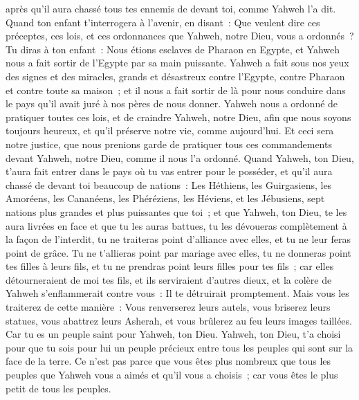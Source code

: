 \begin{multicols}{2}
après qu'il aura chassé tous tes ennemis de devant toi, comme Yahweh l'a dit.
Quand ton enfant t'interrogera à l'avenir, en disant~: Que veulent dire ces préceptes, ces lois, et ces ordonnances que Yahweh, notre Dieu, vous a ordonnés~?
Tu diras à ton enfant~: Nous étions esclaves de Pharaon en Egypte, et Yahweh nous a fait sortir de l'Egypte par sa main puissante.
Yahweh a fait sous nos yeux des signes et des miracles, grands et désastreux contre l'Egypte, contre Pharaon et contre toute sa maison~;
et il nous a fait sortir de là pour nous conduire dans le pays qu'il avait juré à nos pères de nous donner.
Yahweh nous a ordonné de pratiquer toutes ces lois, et de craindre Yahweh, notre Dieu, afin que nous soyons toujours heureux, et qu'il préserve notre vie, comme aujourd'hui.
Et ceci sera notre justice, que nous prenions garde de pratiquer tous ces commandements devant Yahweh, notre Dieu, comme il nous l'a ordonné.
\VerseOne{}Quand Yahweh, ton Dieu, t'aura fait entrer dans le pays où tu vas entrer pour le posséder, et qu'il aura chassé de devant toi beaucoup de nations~: Les Héthiens, les Guirgasiens, les Amoréens, les Cananéens, les Phéréziens, les Héviens, et les Jébusiens, sept nations plus grandes et plus puissantes que toi~;
et que Yahweh, ton Dieu, te les aura livrées en face et que tu les auras battues, tu les dévoueras complètement à la façon de l'interdit, tu ne traiteras point d'alliance avec elles, et tu ne leur feras point de grâce.
Tu ne t'allieras point par mariage avec elles, tu ne donneras point tes filles à leurs fils, et tu ne prendras point leurs filles pour tes fils~;
car elles détourneraient de moi tes fils, et ils serviraient d'autres dieux, et la colère de Yahweh s'enflammerait contre vous~: Il te détruirait promptement.
Mais vous les traiterez de cette manière~: Vous renverserez leurs autels, vous briserez leurs statues, vous abattrez leurs Asherah, et vous brûlerez au feu leurs images taillées.
Car tu es un peuple saint pour Yahweh, ton Dieu. Yahweh, ton Dieu, t'a choisi pour que tu sois pour lui un peuple précieux entre tous les peuples qui sont sur la face de la terre.
Ce n'est pas parce que vous êtes plus nombreux que tous les peuples que Yahweh vous a aimés et qu'il vous a choisis~; car vous êtes le plus petit de tous les peuples.

\end{multicols}
